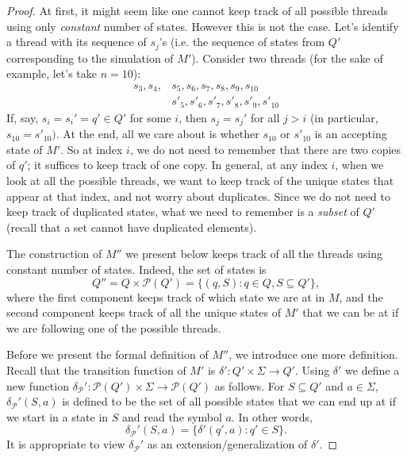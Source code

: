 \begin{flex}
\begin{proof}
At first, it might seem like one cannot keep track of all possible threads using only \emph{constant} number of states. 
However this is not the case. 
Let's identify a thread with its sequence of $s_j$'s (i.e. the sequence of states from $Q'$ corresponding to the simulation of $M'$). 
Consider two threads (for the sake of example, let's take $n = 10$):
\begin{align*}
s_3, s_4, & s_5, s_6, s_7, s_8, s_9, s_{10} \\
& s'_5, s'_6, s'_7, s'_8, s'_9, s'_{10}
\end{align*}
If, say, $s_i = s_i' = q' \in Q'$ for some $i$, then $s_j = s_j'$ for all $j > i$ (in particular, $s_{10} = s'_{10})$. 
At the end, all we care about is whether $s_{10}$ or $s'_{10}$ is an accepting state of $M'$. 
So at index $i$, we do not need to remember that there are two copies of $q'$; it suffices to keep track of one copy. 
In general, at any index $i$, when we look at all the possible threads, we want to keep track of the unique states that appear at that index, and not worry about duplicates. 
Since we do not need to keep track of duplicated states, what we need to remember is a \emph{subset} of $Q'$ (recall that a set cannot have duplicated elements).

The construction of $M''$ we present below keeps track of all the threads using constant number of states. 
Indeed, the set of states is 
\[
    Q'' = Q \times \mathcal{P}(Q') = \{(q, S): q \in Q, S \subseteq Q'\}, 
\]
where the first component keeps track of which state we are at in $M$, and the second component keeps track of all the unique states of $M'$ that we can be at if we are following one of the possible threads.

Before we present the formal definition of $M''$, we introduce one more definition. 
Recall that the transition function of $M'$ is $\delta' : Q' \times \Sigma \to Q'$. 
Using $\delta'$ we define a new function $\delta_{\mathcal{P}}' : \mathcal{P}(Q') \times \Sigma \to \mathcal{P}(Q')$ as follows. 
For $S \subseteq Q'$ and $a \in \Sigma$, $\delta_{\mathcal{P}}'(S, a)$ is defined to be the set of all possible states that we can end up at if we start in a state in $S$ and read the symbol $a$. 
In other words,
\[
   \delta_{\mathcal{P}}'(S, a) = \{\delta'(q', a) : q' \in S\}.
\]
It is appropriate to view $\delta_{\mathcal{P}}'$ as an extension/generalization of $\delta'$.


\end{proof}
\end{flex}
